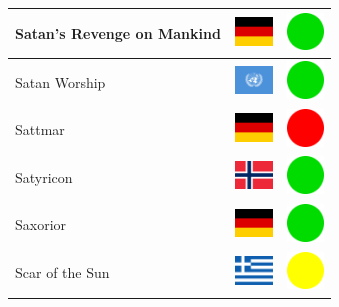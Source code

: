 \documentclass[12pt, a4paper, twoside]{report}
\begin{document}
\begin{center}
\begin{longtable}{|p{5cm}|p{2cm}|p{2cm}|}
 Satan's Revenge on Mankind                                 & \includegraphics[width=1cm]{../4x3/de} &   \includegraphics[width=1cm]{../likes/y} \\ \hline
 Satan Worship                                              & \includegraphics[width=1cm]{../4x3/un} &   \includegraphics[width=1cm]{../likes/y} \\ \hline
 Sattmar                                                    & \includegraphics[width=1cm]{../4x3/de} &   \includegraphics[width=1cm]{../likes/n} \\ \hline
 Satyricon                                                  & \includegraphics[width=1cm]{../4x3/no} &   \includegraphics[width=1cm]{../likes/y} \\ \hline
 Saxorior                                                   & \includegraphics[width=1cm]{../4x3/de} &   \includegraphics[width=1cm]{../likes/y} \\ \hline
 Scar of the Sun                                            & \includegraphics[width=1cm]{../4x3/gr} &   \includegraphics[width=1cm]{../likes/m} \\ \hline

\end{longtable}
\end{center}
\end{document}
